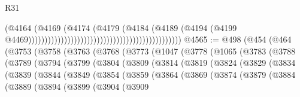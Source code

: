 \begin{lexlean}{R31}
\begin{coremodule}
                                                                                  (@4164
                                                                                    (@4169
                                                                                      (@4174
                                                                                        (@4179
                                                                                          (@4184
                                                                                            (@4189
                                                                                              (@4194
                                                                                                (@4199
                                                                                                  @4469)))))))))))))))))))))))))))))))))))))))))))))))
@4565 := @498
    (@454
      (@464
        (@3753
          (@3758
            (@3763
              (@3768
                (@3773
                  (@1047
                    (@3778
                      (@1065
                        (@3783
                          (@3788
                            (@3789
                              (@3794
                                (@3799
                                  (@3804
                                    (@3809
                                      (@3814
                                        (@3819
                                          (@3824
                                            (@3829
                                              (@3834
                                                (@3839
                                                  (@3844
                                                    (@3849
                                                      (@3854
                                                        (@3859
                                                          (@3864
                                                            (@3869
                                                              (@3874
                                                                (@3879
                                                                  (@3884
                                                                    (@3889
                                                                      (@3894
                                                                        (@3899
                                                                          (@3904
                                                                            (@3909

\end{coremodule}
\end{lexlean}
